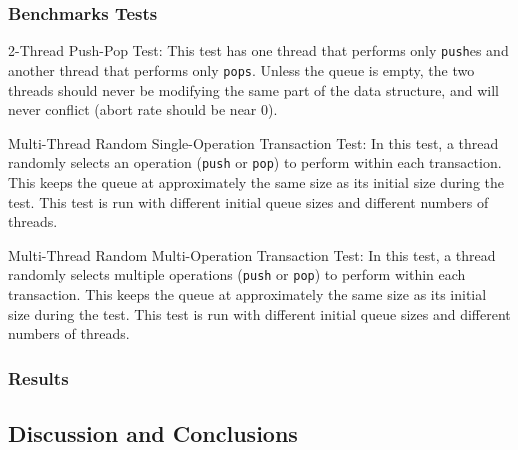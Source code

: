 \subsubsection{Benchmarks Tests}
\begin{ordlist}
\item 2-Thread Push-Pop Test: This test has one thread that performs only \texttt{push}es and another thread that performs only \texttt{pops}. Unless the queue is empty, the two threads should never be modifying the same part of the data structure, and will never conflict (abort rate should be near 0).

\item Multi-Thread Random Single-Operation Transaction Test: 
    In this test, a thread randomly selects an operation (\texttt{push} or \texttt{pop}) to perform within each transaction. This keeps the queue at approximately the same size as its initial size during the test. This test is run with different initial queue sizes and different numbers of threads.
    
\item Multi-Thread Random Multi-Operation Transaction Test: 
    In this test, a thread randomly selects multiple operations (\texttt{push} or \texttt{pop}) to perform within each transaction. This keeps the queue at approximately the same size as its initial size during the test. This test is run with different initial queue sizes and different numbers of threads.
    
\end{ordlist}

\subsubsection{Results}

\subsection{Discussion and Conclusions}
 

